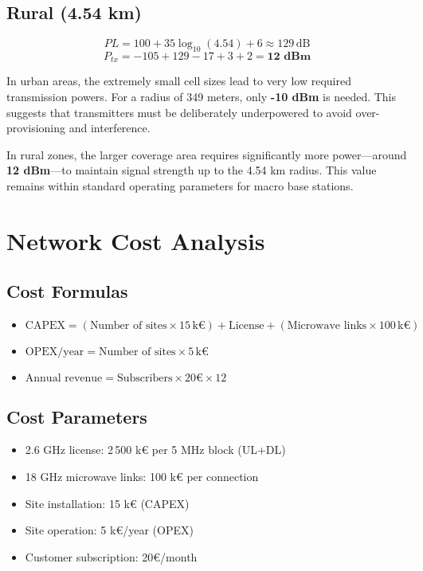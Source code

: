 \documentclass[a4paper,12pt]{article}
\begin{document}
\subsection*{Rural (4.54 km)}

\[ PL = 100 + 35\log_{10}(4.54) + 6 \approx 129\,\text{dB} \]
\[ P_{tx} = -105 + 129 - 17 + 3 + 2 = \textbf{12 dBm} \]

\bigskip

In urban areas, the extremely small cell sizes lead to very low required transmission powers. For a radius of 349 meters, only \textbf{-10 dBm} is needed. This suggests that transmitters must be deliberately underpowered to avoid over-provisioning and interference.

In rural zones, the larger coverage area requires significantly more power—around \textbf{12 dBm}—to maintain signal strength up to the 4.54 km radius. This value remains within standard operating parameters for macro base stations.

\section{Network Cost Analysis}

\subsection*{Cost Formulas}
\begin{itemize}
    \item $\text{CAPEX} = (\text{Number of sites} \times 15\,\text{k€}) + \text{License} + (\text{Microwave links} \times 100\,\text{k€})$
    \item $\text{OPEX/year} = \text{Number of sites} \times 5\,\text{k€}$
    \item $\text{Annual revenue} = \text{Subscribers} \times 20€ \times 12$
\end{itemize}

\subsection*{Cost Parameters}
\begin{itemize}
    \item 2.6 GHz license: 2\,500 k€ per 5 MHz block (UL+DL)
    \item 18 GHz microwave links: 100 k€ per connection
    \item Site installation: 15 k€ (CAPEX)
    \item Site operation: 5 k€/year (OPEX)
    \item Customer subscription: 20€/month
\end{itemize}
\end{document}
